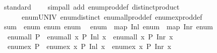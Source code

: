 \begin{isabellebody}
%
\isatagproof
{}\isamarkupfalse%
\ standard\isanewline
\ \ \ \ {\isacharparenleft}{\kern0pt}simp{\isacharunderscore}{\kern0pt}all\ add{\isacharcolon}{\kern0pt}\ enum{\isacharunderscore}{\kern0pt}prod{\isacharunderscore}{\kern0pt}def\ distinct{\isacharunderscore}{\kern0pt}product\isanewline
\ \ \ \ \ \ enum{\isacharunderscore}{\kern0pt}UNIV\ enum{\isacharunderscore}{\kern0pt}distinct\ enum{\isacharunderscore}{\kern0pt}all{\isacharunderscore}{\kern0pt}prod{\isacharunderscore}{\kern0pt}def\ enum{\isacharunderscore}{\kern0pt}ex{\isacharunderscore}{\kern0pt}prod{\isacharunderscore}{\kern0pt}def{\isacharparenright}{\kern0pt}%
\endisatagproof
{\isafoldproof}%
%
\isadelimproof
\isanewline
%
\endisadelimproof
\isanewline
{}\isamarkupfalse%
\isanewline
\isanewline
{}\isamarkupfalse%
\ sum\ {\isacharcolon}{\kern0pt}{\isacharcolon}{\kern0pt}\ {\isacharparenleft}{\kern0pt}enum{\isacharcomma}{\kern0pt}\ enum{\isacharparenright}{\kern0pt}\ enum\isanewline
{}\isanewline
\isanewline
{}\isamarkupfalse%
\isanewline
\ \ {\isachardoublequoteopen}enum\ {\isacharequal}{\kern0pt}\ map\ Inl\ enum\ {\isacharat}{\kern0pt}\ map\ Inr\ enum{\isachardoublequoteclose}\isanewline
\isanewline
{}\isamarkupfalse%
\isanewline
\ \ {\isachardoublequoteopen}enum{\isacharunderscore}{\kern0pt}all\ P\ {\isasymlongleftrightarrow}\ enum{\isacharunderscore}{\kern0pt}all\ {\isacharparenleft}{\kern0pt}{\isasymlambda}x{\isachardot}{\kern0pt}\ P\ {\isacharparenleft}{\kern0pt}Inl\ x{\isacharparenright}{\kern0pt}{\isacharparenright}{\kern0pt}\ {\isasymand}\ enum{\isacharunderscore}{\kern0pt}all\ {\isacharparenleft}{\kern0pt}{\isasymlambda}x{\isachardot}{\kern0pt}\ P\ {\isacharparenleft}{\kern0pt}Inr\ x{\isacharparenright}{\kern0pt}{\isacharparenright}{\kern0pt}{\isachardoublequoteclose}\isanewline
\isanewline
{}\isamarkupfalse%
\isanewline
\ \ {\isachardoublequoteopen}enum{\isacharunderscore}{\kern0pt}ex\ P\ {\isasymlongleftrightarrow}\ enum{\isacharunderscore}{\kern0pt}ex\ {\isacharparenleft}{\kern0pt}{\isasymlambda}x{\isachardot}{\kern0pt}\ P\ {\isacharparenleft}{\kern0pt}Inl\ x{\isacharparenright}{\kern0pt}{\isacharparenright}{\kern0pt}\ {\isasymor}\ enum{\isacharunderscore}{\kern0pt}ex\ {\isacharparenleft}{\kern0pt}{\isasymlambda}x{\isachardot}{\kern0pt}\ P\ {\isacharparenleft}{\kern0pt}Inr\ x{\isacharparenright}{\kern0pt}{\isacharparenright}{\kern0pt}{\isachardoublequoteclose}\isanewline
\isanewline
{}\isamarkupfalse%
%
\isadelimproof
\ %
\endisadelimproof

\end{isabellebody}
